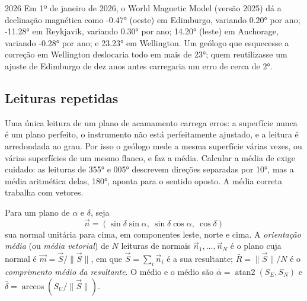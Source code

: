 \begin{dated}{2026}
Em 1º de janeiro de 2026, o World Magnetic Model (versão 2025) dá a declinação magnética como \ang{-0.47} (oeste) em Edimburgo, variando \ang{+0.20} por ano; \ang{-11.28} em Reykjavik, variando \ang{+0.30} por ano; \ang{+14.20} (leste) em Anchorage, variando \ang{-0.28} por ano; e \ang{+23.23} em Wellington. Um geólogo que esquecesse a correção em Wellington deslocaria todo  em mais de \ang{23}; quem reutilizasse um ajuste de Edimburgo de dez anos antes carregaria um erro de cerca de \ang{2}.
\end{dated}

\subsection{Leituras repetidas}

Uma única leitura de um plano de acamamento carrega erros: a superfície nunca é um plano perfeito, o instrumento não está perfeitamente ajustado, e a leitura é arredondada ao grau. Por isso o geólogo mede a mesma superfície várias vezes, ou várias superfícies de um mesmo flanco, e faz a média. Calcular a média de  exige cuidado: as leituras de \ang{355} e \ang{005} descrevem direções separadas por \ang{10}, mas a média aritmética delas, \ang{180}, aponta para o sentido oposto. A média correta trabalha com vetores.

\begin{definition}\label{def:b1:field-lab-methods-1:mean-orientation}
Para um plano de  $\alpha$ e  $\delta$, seja
\[
  \vec n = (\sin\delta\sin\alpha,\ \sin\delta\cos\alpha,\ \cos\delta)
\]
sua normal unitária para cima, em componentes leste, norte e cima. A \emph{orientação média} (ou \emph{média vetorial}) de $N$ leituras de normais $\vec n_1, \dots, \vec n_N$ é o plano cuja normal é $\vec m = \vec S/\|\vec S\|$, em que $\vec S = \sum_i \vec n_i$ é a sua resultante; $\bar R = \|\vec S\|/N$ é o \emph{comprimento médio da resultante}. O  médio e o  médio são $\bar\alpha = \operatorname{atan2}(S_E, S_N)$ e $\bar\delta = \arccos(S_U/\|\vec S\|)$.
\end{definition}

